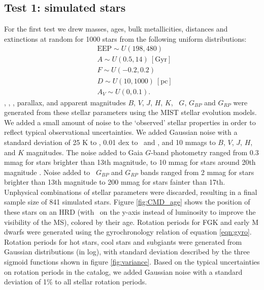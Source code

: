\subsection{Test 1: simulated stars}
For the first test we drew masses, ages, bulk metallicities, distances and
extinctions at random for 1000 stars from the following uniform distributions:
\begin{eqnarray}
& \mathrm{EEP} \sim U(198, 480) \\
& A \sim U(0.5, 14)\mathrm{~[Gyr]} \\
& F \sim U(-0.2, 0.2) \\
& D \sim U(10, 1000)~\mathrm{[pc]} \\
& A_V \sim U(0, 0.1).
\end{eqnarray}
\teff, \logg, \fhat, parallax, and apparent magnitudes $B$, $V$, $J$, $H$, $K$,
\gaia\ $G$, $G_{BP}$ and $G_{RP}$ were generated from these
stellar parameters using the MIST stellar evolution models.
We added a small amount of noise to the `observed' stellar properties in order
to reflect typical observational uncertainties.
We added Gaussian noise with a standard deviation of 25 K to \teff, 0.01 dex
to \feh\ and \logg, and 10 mmags to $B$, $V$, $J$, $H$, and $K$ magnitudes.
The noise added to Gaia $G$-band photometry ranged from
0.3 mmag for stars brighter than 13th magnitude, to 10 mmag for stars
around 20th magnitude \citep{evans2017, brown2018}.
Noise added to \gaia\ $G_{BP}$ and $G_{RP}$ bands ranged from 2 mmag for stars
brighter than 13th magnitude to 200 mmag for stars fainter than 17th.
Unphysical combinations of stellar parameters were discarded, resulting in a
final sample size of 841 simulated stars.
Figure \ref{fig:CMD_age} shows the position of these stars on an HRD
(with \logg\ on the y-axis instead of luminosity to improve the visibility of
the MS), colored by their age.
Rotation periods for FGK and early M dwarfs were generated using the
gyrochronology relation of equation \ref{eqn:gyro}.
Rotation periods for hot stars, cool stars and subgiants were generated from
Gaussian distributions (in log), with standard deviation described by the
three sigmoid functions shown in figure \ref{fig:variance}.
Based on the typical uncertainties on rotation periods in the
\citet{mcquillan2014} catalog, we added Gaussian noise with a standard
deviation of 1\% to all stellar rotation periods.
